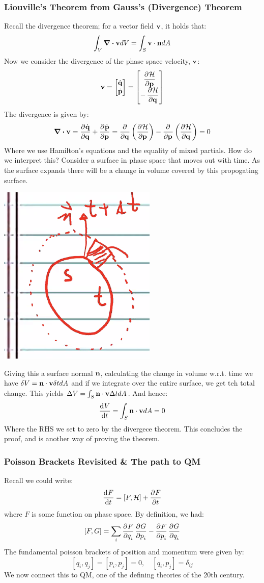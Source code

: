 \documentclass[../PHYS306Notes.tex]{subfiles}
\begin{document}
\subsubsection{Liouville's Theorem from Gauss's (Divergence) Theorem}
Recall the divergence theorem; for a vector field $\mathbf{v}$, it holds that:
\[\int_V \div{\ensuremath{\mathbf{v}}} dV = \int_S \mathbf{v} \cdot \mathbf{n} dA\]
Now we consider the divergence of the phase space velocity, $\mathbf{v}$:
\[\v{v} = \m{\dot{\v{q}} \\ \dot{\v{p}}} = \m{\dpd{\HH}{\v{p}} \\ -\dpd{\HH}{\v{q}}}\]
The divergence is given by:
\[\div{\v{v}} = \dpd{\dot{\v{q}}}{\v{q}} + \dpd{\dot{\v{p}}}{\v{p}} = \dpd{}{\v{q}}\left(\dpd{\HH}{\v{p}}\right) - \dpd{}{\v{p}}\left(\dpd{\HH}{\v{q}}\right) = 0\]
Where we use Hamilton's equations and the equality of mixed partials. How do we interpret this? Consider a surface in phase space that moves out with time. As the surface expands there will be a change in volume covered by this propogating surface.
\begin{center}
    \includegraphics[scale=0.7]{Lecture-26/l26-img1.png}
\end{center}
Giving this a surface normal $\mathbf{n}$, calculating the change in volume w.r.t. time we have $\delta V = \mathbf{n}\cdot \mathbf{v}\delta t dA$ and if we integrate over the entire surface, we get teh total change. This yields $\Delta V = \int_S \mathbf{n} \cdot \mathbf{v}\Delta t dA$. And hence:
\[\dod{V}{t} = \int_S \v{n}\cdot \v{v}dA = 0\]
Where the RHS we set to zero by the divergece theorem. This concludes the proof, and is another way of proving the theorem.

\subsubsection{Poisson Brackets Revisited \& The path to QM}
Recall we could write:
\[\dod{F}{t} = [F, \HH] + \dpd{F}{t}\]
where $F$ is some function on phase space. By definition, we had:
\[[F, G] = \sum_i \dpd{F}{q_i}\dpd{G}{p_i} - \dpd{F}{p_i}\dpd{G}{q_i}\]
The fundamental poisson brackets of position and momentum were given by:
\[[q_i, q_j] = [p_i, p_j] = 0, \quad [q_i, p_j] = \delta_{ij}\]
We now connect this to QM, one of the defining theories of the 20th century. 
\end{document}
